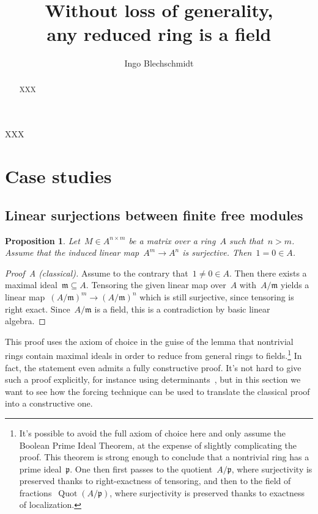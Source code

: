\documentclass{amsart}
\title[Without loss of generality, any reduced ring is a field]{Without loss of generality, \\ any reduced ring is a field}
\author{Ingo Blechschmidt}
\theoremstyle{definition}
\theoremstyle{plain}
\newtheorem{prop}[defn]{Proposition}
\theoremstyle{remark}
\newcommand{\mmm}{\mathfrak{m}}
\newcommand{\ppp}{\mathfrak{p}}
\DeclareMathOperator{\Quot}{Quot}
\newcommand{\?}{\,{:}\,}
\begin{document}
\begin{abstract}
  XXX
\end{abstract}

\maketitle
\thispagestyle{empty}

\noindent
XXX


\section{Case studies}

\subsection{Linear surjections between finite free modules}

\begin{prop}\label{surjection}
Let~$M \in A^{n \times m}$ be a matrix over a ring~$A$ such that~$n
> m$. Assume that the induced linear map~$A^m \to A^n$ is surjective. Then~$1 =
0 \in A$.
\end{prop}

\begin{proof}[Proof~A (classical)]Assume to the contrary that~$1 \neq 0 \in A$.
Then there exists a maximal ideal~$\mmm \subseteq A$. Tensoring the given linear map
over~$A$ with~$A/\mmm$ yields a linear map~$(A/\mmm)^m \to (A/\mmm)^n$ which is
still surjective, since tensoring is right exact. Since~$A/\mmm$ is a field,
this is a contradiction by basic linear algebra.
\end{proof}

This proof uses the axiom of choice in the guise of the lemma that nontrivial
rings contain maximal ideals in order to reduce from general rings to
fields.\footnote{It's possible to avoid the full axiom of choice here and only
assume the Boolean Prime Ideal Theorem, at the expense of slightly complicating
the proof. This theorem is strong enough to conclude that a nontrivial ring has
a prime ideal~$\ppp$. One then first passes to the quotient~$A/\ppp$, where
surjectivity is preserved thanks to right-exactness of tensoring, and then to
the field of fractions~$\Quot(A/\ppp)$, where surjectivity is preserved thanks
to exactness of localization.} In fact, the statement even admits a fully
constructive proof. It's not hard to give such a proof explicitly, for instance
using determinants~\cite{richman:trivial-rings}, but in this section we want to
see how the forcing technique can be used to translate the classical proof into
a constructive one.
\end{document}
